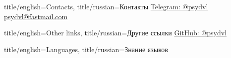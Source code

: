 \documentclass[12pt,a4paper]{article}
\begin{document}
\begin{minipage}[t]{0.33\linewidth}
\begin{Section*}{
title/english={Contacts},
title/russian={Контакты}
}
  \href{https://t.me/psydvl}{Telegram: @psydvl}\\
  \href{mailto:psydvl@fastmail.com}{psydvl@fastmail.com}
\end{Section*}

\begin{Section*}{
title/english={Other links},
title/russian={Другие ссылки}
}
  \href{https://github.com/psydvl}{GitHub: @psydvl}\\
\end{Section*}

\begin{Section*}{
title/english={Languages},
title/russian={Знание языков}
}
\end{Section*}

\end{minipage}
\end{document}
